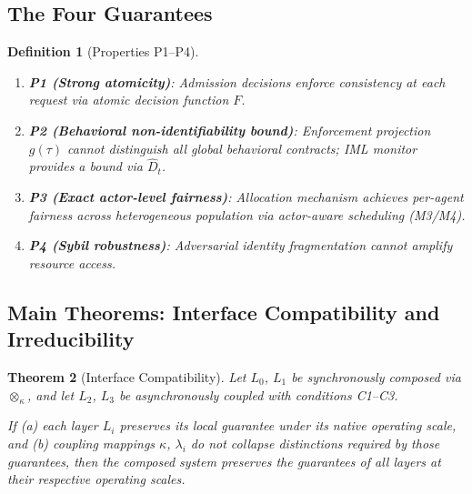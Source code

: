 \documentclass[11pt]{article}
\newtheorem{theorem}{Theorem}[section]
\newtheorem{definition}[theorem]{Definition}
\newcommand{\Dhat}{\widehat{D}}
\newcommand{\Sum}[1]{\lambda_{#1}}
\newcommand{\Layer}[1]{L_{#1}}
\newcommand{\Comp}{\otimes_\kappa}
\begin{document}
\subsection{The Four Guarantees}

\begin{definition}[Properties P1--P4]
\label{def:properties}
\begin{enumerate}[label=(P\arabic*),noitemsep]
  \item \textbf{P1 (Strong atomicity)}: Admission decisions enforce consistency at each request via atomic decision function $F$.
  \item \textbf{P2 (Behavioral non-identifiability bound)}: Enforcement projection $g(\tau)$ cannot distinguish all global behavioral contracts; IML monitor provides a bound via $\Dhat_t$.
  \item \textbf{P3 (Exact actor-level fairness)}: Allocation mechanism achieves per-agent fairness across heterogeneous population via actor-aware scheduling (M3/M4).
  \item \textbf{P4 (Sybil robustness)}: Adversarial identity fragmentation cannot amplify resource access.
\end{enumerate}
\end{definition}

\subsection{Main Theorems: Interface Compatibility and Irreducibility}

\begin{theorem}[Interface Compatibility]
\label{thm:compatibility}
Let $\Layer{0}$, $\Layer{1}$ be synchronously composed via $\Comp$, and let $\Layer{2}$, $\Layer{3}$ be asynchronously coupled with conditions C1--C3.

If (a) each layer $\Layer{i}$ preserves its local guarantee under its native operating scale, and (b) coupling mappings $\kappa$, $\Sum{i}$ do not collapse distinctions required by those guarantees, then the composed system preserves the guarantees of all layers at their respective operating scales.
\end{theorem}
\end{document}
